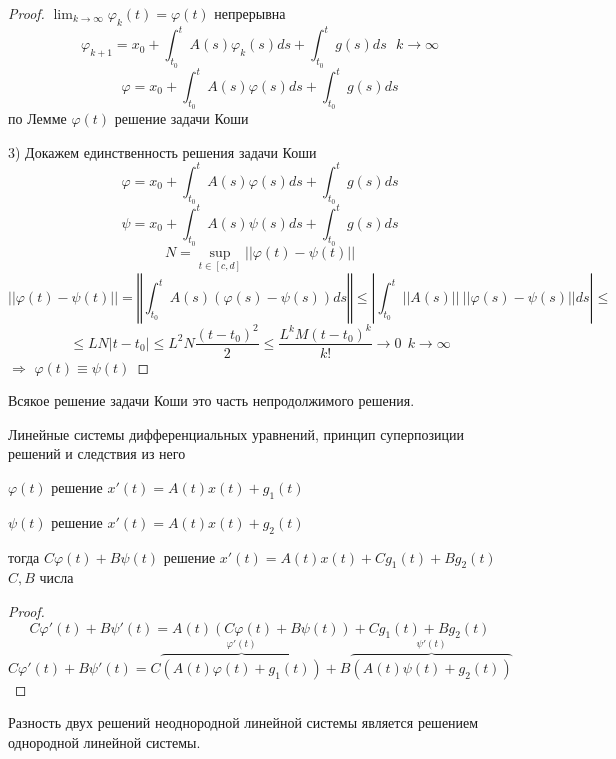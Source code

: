 \begin{proof}
  $\lim_{k \to \infty} \varphi_k(t) = \varphi(t)$ непрерывна
  $$
  \varphi_{k+1} = x_0 + \int_{t_0}^t A(s) \varphi_k(s) ds + \int_{t_0}^t g(s)ds
  ~~~ k \to \infty
  $$
  $$
  \varphi = x_0 + \int_{t_0}^t A(s) \varphi(s) ds + \int_{t_0}^t g(s)ds
  $$
  по Лемме $\varphi(t)$ решение задачи Коши

  3) Докажем единственность решения задачи Коши
  $$
  \varphi = x_0 + \int_{t_0}^t A(s) \varphi(s) ds + \int_{t_0}^t g(s)ds
  $$
  $$
  \psi = x_0 + \int_{t_0}^t A(s) \psi(s) ds + \int_{t_0}^t g(s)ds
  $$
  $$
  N = \sup_{t \in [c,d]} ||\varphi(t) - \psi(t)||
  $$
  $$
  ||\varphi(t) - \psi(t)|| = \left\Vert\int_{t_0}^t A(s)
  (\varphi(s) - \psi(s))ds \right\Vert \le \left| \int_{t_0}^t ||A(s)|| ~
  ||\varphi(s) - \psi(s)||ds \right| \le
  $$
  $$
  \le LN|t-t_0| \le L^2 N \frac{(t - t_0)^2}{2} \le
  \frac{L^k M (t - t_0)^k}{k!} \to 0 ~~ k \to \infty
  $$
  $\Rightarrow$ $\varphi(t) \equiv \psi(t)$
\end{proof}

\begin{theorem}
  Всякое решение задачи Коши это часть непродолжимого решения.
\end{theorem}

\begin{title}[\Large]
  Линейные системы дифференциальных уравнений, принцип суперпозиции решений и
  следствия из него
\end{title}

\begin{theorem}
  $\varphi(t)$ решение $x'(t) = A(t)x(t) + g_1(t)$

  $\psi(t)$ решение $x'(t) = A(t)x(t) + g_2(t)$

  тогда $C\varphi(t) + B\psi(t)$ решение $x'(t) = A(t)x(t) + Cg_1(t) + Bg_2(t)$
  $C,B$ числа
\end{theorem}

\begin{proof}
  $$
  C\varphi'(t) + B\psi'(t) = A(t)(C\varphi(t) + B\psi(t)) + Cg_1(t) +
  Bg_2(t)
  $$
  $$
  C\varphi'(t) + B\psi'(t) =
  C \overbrace{(A(t)\varphi(t) + g_1(t))}^{\varphi'(t)}+
  B \overbrace{(A(t)\psi(t) + g_2(t))}^{\psi'(t)}
  $$
\end{proof}

\begin{block}[Следствие 1]
  Разность двух решений неоднородной линейной системы является решением
  однородной линейной системы.
\end{block}

